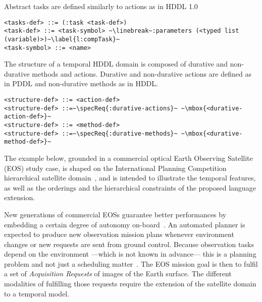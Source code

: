\documentclass[letterpaper]{article} %
\begin{document}
%
%
\noindent Abstract tasks are defined similarly to actions as in HDDL 1.0
\begin{lstlisting}[firstnumber=last, escapechar=~]
<tasks-def> ::= (:task <task-def>)
<task-def> ::= <task-symbol> ~\linebreak~:parameters (<typed list (variable)>)~\label{l:compTask}~
<task-symbol> ::= <name>
\end{lstlisting}

\noindent The structure of a temporal HDDL domain is composed of durative and non-durative methods and actions. Durative and non-durative actions are defined as in PDDL and non-durative methods as in HDDL.

\begin{lstlisting}[firstnumber=last, escapechar=~]
<structure-def> ::= <action-def>
<structure-def> ::=~\specReq{:durative-actions}~ ~\mbox{<durative-action-def>}~
<structure-def> ::= <method-def>
<structure-def> ::=~\specReq{:durative-methods}~ ~\mbox{<durative-method-def>}~
\end{lstlisting}






The example below, grounded in a commercial optical Earth Observing Satellite (EOS) study case, is shaped on the International Planning Competition hierarchical satellite domain~\citep{schattenberg2020}, and is intended to illustrate the temporal features, as well as the orderings and the hierarchical constraints of the proposed language extension.

New generations of commercial EOSs guarantee better performances by embedding a certain degree of autonomy on-board~\citep{pralet2019}. An automated planner is expected to produce new observation mission plans whenever environment changes or new requests are sent from ground control. Because observation tasks depend on the environment ---which is not known in advance--- this is a planning problem and not just a scheduling matter~\citep{rodriguez-moreno2004}.
%
The EOS mission goal is then to fulfil a set of \emph{Acquisition Requests} of images of the Earth surface.
The different modalities of fulfilling those requests require the extension of the satellite domain to a temporal model.
\end{document}
